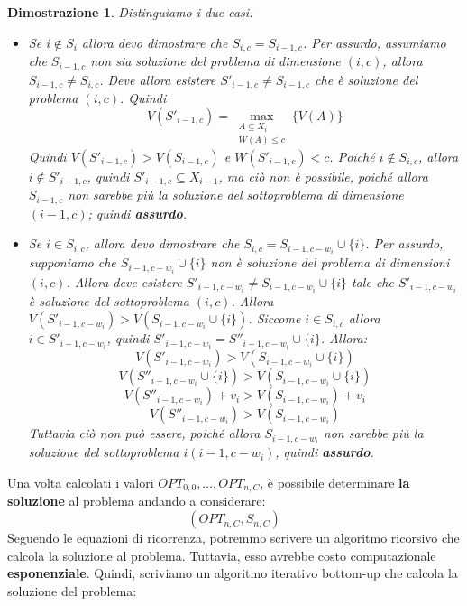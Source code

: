 \documentclass[12pt]{article}
\newtheorem{Dimostrazione}{Dimostrazione}[subsection]
\begin{document}
\begin{Dimostrazione}
    Distinguiamo i due casi:
    \begin{itemize}
        \item Se $i \notin S_i$ allora devo dimostrare che $S_{i,c} = S_{i-1,c}$.
        Per assurdo, assumiamo che $S_{i-1,c}$ non sia soluzione del problema di dimensione $(i, c)$, allora $S_{i-1,c} \neq S_{i,c}$.
        Deve allora esistere $S'_{i-1, c} \neq S_{i-1, c}$ che è soluzione del problema $(i,c)$.
        Quindi $$V(S'_{i-1,c}) = \max_{\substack{A \subseteq X_i \\ W(A) \leq c}}\{V(A)\}$$
        Quindi $V(S'_{i-1,c}) > V(S_{i-1, c})$ e $W(S'_{i-1,c}) < c$.
        Poiché $i \notin S_{i,c}$, allora $i \notin S'_{i-1, c}$, quindi $S'_{i-1, c} \subseteq X_{i-1}$, ma ciò non è possibile, poiché allora $S_{i-1, c}$ non sarebbe
        più la soluzione del sottoproblema di dimensione $(i-1, c)$; quindi \textbf{assurdo}.
        \item Se $i \in S_{i,c}$, allora devo dimostrare che $S_{i,c} = S_{i-1, c-w_i} \cup \{i\}$. Per assurdo, supponiamo che $S_{i-1, c-w_i} \cup \{i\}$
        non è soluzione del problema di dimensioni $(i,c)$. Allora deve esistere $S'_{i-1, c - w_{i}} \neq S_{i-1, c-w_i} \cup \{i\}$ tale che $S'_{i-1, c -w_i}$ è soluzione del sottoproblema $(i,c)$.
        Allora $V(S'_{i-1, c-w_{i}}) > V(S_{i-1, c-w_i} \cup \{i\})$. \newline
        Siccome $i \in S_{i,c}$ allora $i \in S'_{i-1, c-w_{i}}$, quindi $S'_{i-1, c-w_i} = S''_{i-1, c-w_i} \cup \{i\}$. Allora:
        $$V(S'_{i-1, c-w_{i}}) > V(S_{i-1, c-w_i} \cup \{i\})$$
        $$V(S''_{i-1, c-w_{i}} \cup \{i\}) > V(S_{i-1, c-w_i} \cup \{i\})$$
        $$V(S''_{i-1, c-w_{i}}) + v_i > V(S_{i-1, c-w_i}) + v_i$$
        $$V(S''_{i-1, c-w_{i}}) > V(S_{i-1, c-w_i})$$
        Tuttavia ciò non può essere, poiché allora $S_{i-1, c-w_i}$ non sarebbe più la soluzione del sottoproblema $i(i-1, c-w_i)$, quindi \textbf{assurdo}.

    \end{itemize}
\end{Dimostrazione}
Una volta calcolati i valori $OPT_{0,0}, \dots, OPT_{n, C}$, è possibile determinare \textbf{la soluzione} al problema andando a considerare:
$$(OPT_{n, C}, S_{n, C})$$
Seguendo le equazioni di ricorrenza, potremmo scrivere un algoritmo ricorsivo che calcola la soluzione al problema. Tuttavia, esso avrebbe costo computazionale \textbf{esponenziale}.
Quindi, scriviamo un algoritmo iterativo bottom-up che calcola la soluzione del problema: \newline
\end{document}
